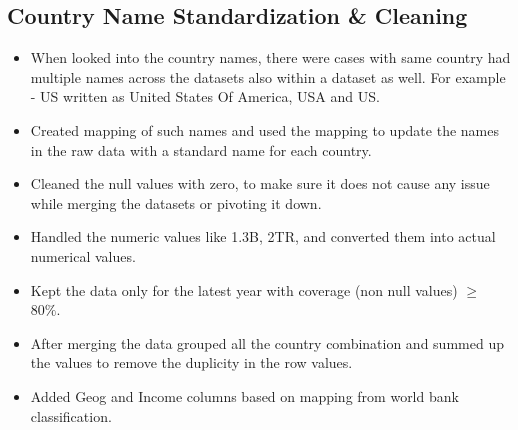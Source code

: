 \documentclass{article}
\begin{document}
\subsection{Country Name Standardization \& Cleaning}
\begin{itemize}
    \item When looked into the country names, there were cases with same country had multiple names across the datasets also within a dataset as well. For example - US written as United States Of America, USA and US.
    \item Created mapping of such names and used the mapping to update the names in the raw data with a standard name for each country.
    \item Cleaned the null values with zero, to make sure it does not cause any issue while merging the datasets or pivoting it down.
    \item Handled the numeric values like 1.3B, 2TR, and converted them into actual numerical values.
    \item Kept the data only for the latest year with coverage (non null values) $\geq$ $80\%$.
    \item After merging the data grouped all the country combination and summed up the values to remove the duplicity in the row values.
    \item Added Geog and Income columns based on mapping from world bank classification.
\end{itemize}
\end{document}
